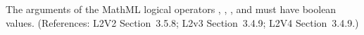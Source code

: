 The arguments of the MathML logical operators ,
, , and  must have boolean values.
(References: L2V2 Section~3.5.8; L2v3 Section~3.4.9; L2V4 Section~3.4.9.)

